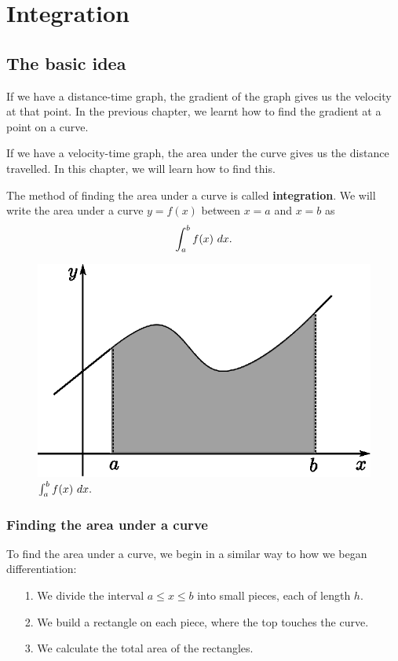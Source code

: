 \chapter{Integration}
\section{The basic idea}
If we have a distance-time graph, the gradient of the graph gives us the velocity at that point. In the previous chapter, we learnt how to
find the gradient at a point on a curve.

If we have a velocity-time graph, the area under the curve gives us the distance travelled. In this chapter, we will learn how to find this.

The method of finding the area under a curve is called \textbf{integration}.
We will write the area under a curve $y=f(x)$ between $x=a$ and $x=b$ as \[\int_a^b f(x) \ dx.\]

\begin{figure}[H]
    \includegraphics[scale=0.75]{img/integration-shaded-graph}
    \centering
  \caption{$\int_a^b f(x) \ dx.$}
\end{figure}

\subsection{Finding the area under a curve}
To find the area under a curve, we begin in a similar way to how we began differentiation:

\begin{itemize}
\item[1.] We divide the interval $a\le x\le b$ into small pieces, each of length $h$. 
\item[2.] We build a rectangle on each piece, where the top touches the curve.
\item[3.] We calculate the total area of the rectangles.
\end{itemize}

